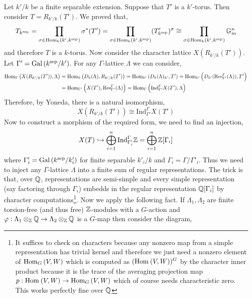 \documentclass[12pt]{article}
\begin{document}
Let $k'/k$ be a finite separable extension. Suppose that $T'$ is a $k'$-torus. Then consider $T = R_{k'/k}(T')$. We proved that,
\[ T_{k^{\mathrm{sep}}} = \prod_{\sigma \in \mathrm{Hom}_{k} \left( k', k^{\mathrm{sep}} \right)} \sigma^*(T') = \prod_{\sigma \in \mathrm{Hom}_{k} \left( k', k^{\mathrm{sep}} \right)} (T'_{k^{\mathrm{sep}}})^\sigma \cong \prod_{\sigma \in \mathrm{Hom}_{k} \left( k', k^{\mathrm{sep}} \right)} \mathbb{G}_m^n \]
and therefore $T$ is a $k$-torus. Now consider the character lattice $X(R_{k'/k}(T'))$. Let $\Gamma' = \mathrm{Gal}\left( k^{\mathrm{sep}}/k' \right)$. For any $\Gamma$-lattice $\Lambda$ we can consider,
\begin{align*}
\mathrm{Hom}_{\Gamma} \left( X(R_{k'/k}(T')), \Lambda \right) & = \mathrm{Hom}_{k} \left( D_k(\Lambda), R_{k'/k}(T') \right) = \mathrm{Hom}_{k'} \left( D_{k}(\Lambda)_{k'}, T' \right) = \mathrm{Hom}_{k'} \left( D_{k'}(\mathrm{Res}^\Gamma_{\Gamma'} (\Lambda)), T' \right) 
\\
& = \mathrm{Hom}_{\Gamma'} \left( X(T'), \mathrm{Res}^\Gamma_{\Gamma'} (\Lambda) \right)= \mathrm{Hom}_{\Gamma} \left( \mathrm{Ind}^\Gamma_{\Gamma'} X(T'), \Lambda \right)
\end{align*}
Therefore, by Yoneda, there is a natural isomorphism,
\[ X(R_{k'/k}(T')) \cong \mathrm{Ind}^\Gamma_{\Gamma'} X(T') \]
Now to construct a morphism of the required form, we need to find an injection,
\[ X(T) \hookrightarrow \bigoplus_{i = 1}^n \mathrm{Ind}^\Gamma_{\Gamma'_i} \mathbb{Z} = \bigoplus_{i = 1}^n \mathbb{Z}[\Gamma_i] \]
where $\Gamma_i' = \mathrm{Gal}\left( k^{\mathrm{sep}}/k'_i \right)$ for finite separable $k'_i / k$ and $\Gamma_i = \Gamma / \Gamma'_i$. Thus we need to inject any $\Gamma$-lattice $\Lambda$ into a finite sum of regular representations. The trick is that, over $\mathbb{Q}$, representations are semi-simple and every simple representation (say factoring through $\Gamma_i$) embedds in the regular representation $\mathbb{Q}[\Gamma_i]$ by character computations\footnote{It suffices to check on characters because any nonzero map from a simple representation has trivial kernel and therefore we just need a nonzero element of $\mathrm{Hom}_{G} \left( V, W \right)$ which is computed as $(\mathrm{Hom}_{} \left( V, W \right))^G$ by the character inner product because it is the trace of the averaging projection map $p : \mathrm{Hom}_{} \left( V, W \right) \to \mathrm{Hom}_{G} \left( V, W \right)$ which of course needs characteristic zero. This works perfectly fine over $\mathbb{Q}$}. Now we apply the following fact. If $\Lambda_1, \Lambda_2$ are finite torsion-free (and thus free) $\mathbb{Z}$-modules with a $G$-action and $\varphi : \Lambda_1 \otimes_{\mathbb{Z}} \mathbb{Q} \to \Lambda_2 \otimes_{\mathbb{Z}} \mathbb{Q}$ is a $G$-map then consider the diagram,
\begin{center}
\end{center}
\end{document}
